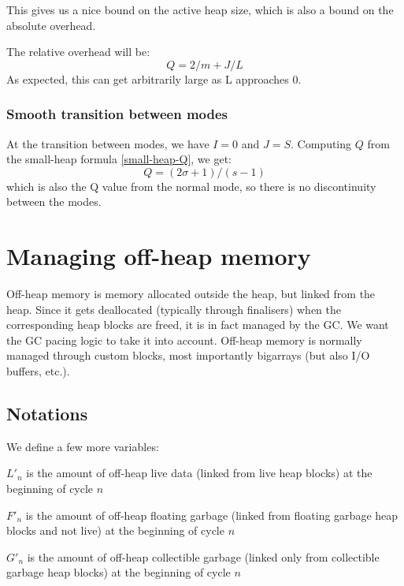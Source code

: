 \documentclass{article}
\begin{document}
This gives us a nice bound on the active heap size, which is also a
bound on the absolute overhead.

The relative overhead will be:
\begin{equation}\label{small-heap-Q}
  Q = 2/m + J/L
\end{equation}
As expected, this can get arbitrarily large as L approaches 0.

\subsubsection{Smooth transition between modes}

At the transition between modes, we have $I = 0$ and $J =
S$. Computing $Q$ from the small-heap formula \eqref{small-heap-Q}, we
get:
\begin{equation}
  Q = (2\sigma+1)/(s-1)
\end{equation}
which is also the Q value from the normal mode, so there is no
discontinuity between the modes.


\section{Managing off-heap memory}

Off-heap memory is memory allocated outside the heap, but linked from
the heap. Since it gets deallocated (typically through finalisers)
when the corresponding heap blocks are freed, it is in fact managed by
the GC. We want the GC pacing logic to take it into account. Off-heap
memory is normally managed through custom blocks, most importantly
bigarrays (but also I/O buffers, etc.).

\subsection{Notations}

We define a few more variables:

\bigskip
$L'_n$ is the amount of off-heap live data (linked from live
heap blocks) at the beginning of cycle $n$

$F'_n$ is the amount of off-heap floating garbage (linked from
floating garbage heap blocks and not live) at the beginning of
cycle $n$

$G'_n$ is the amount of off-heap collectible garbage (linked only from
collectible garbage heap blocks) at the beginning of cycle $n$
\end{document}
